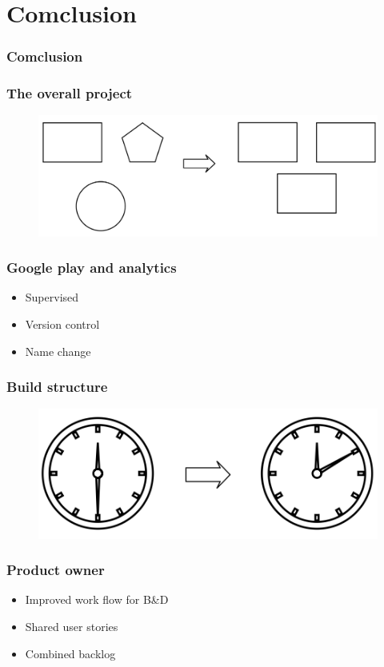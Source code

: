 \section{Comclusion}
\begin{frame}
	\frametitle{Comclusion}
\end{frame}

\begin{frame}
	\frametitle{The overall project}
	\begin{figure}[H]
		\centering
		\includegraphics[width= 0.8 \textwidth]{pictures/SameGUIDesign.png}
	\end{figure}
\end{frame}

\begin{frame}
	\frametitle{Google play and analytics}
	\begin{itemize}
		\item Supervised
		\item Version control
		\item Name change
	\end{itemize}
\end{frame}

\begin{frame}
	\frametitle{Build structure}
	\begin{figure}[H]
		\centering
		\includegraphics[width= 0.8 \textwidth]{pictures/Buildtime.png}
	\end{figure}
\end{frame}

\begin{frame}
	\frametitle{Product owner}
	\begin{itemize}
		\item Improved work flow for B\&D
		\item Shared user stories
		\item Combined backlog
	\end{itemize}
\end{frame}



